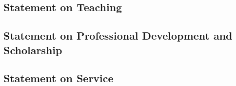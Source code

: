 \subsection*{Statement on Teaching}


\newpage


\newpage
\subsection*{Statement on Professional Development and Scholarship}


\newpage
\subsection*{Statement on Service}


